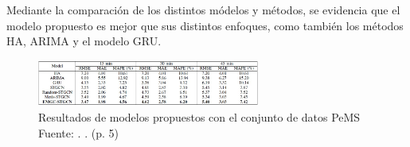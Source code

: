 Mediante la comparación de los distintos módelos y métodos, se evidencia que el modelo propuesto es mejor que sus distintos enfoques, como también los métodos HA, ARIMA y el modelo GRU.
 


\begin{figure}[h]
	\begin{center}
		\includegraphics[width=0.65\textwidth]{2/figures/clusterRE2.jpg}
		\caption{Resultados de modelos propuestos con el conjunto de datos PeMS \\
			Fuente: \citep*{pr_zhang}. . (p. 5)}
		\label{1:fig2}
	\end{center}
\end{figure}
